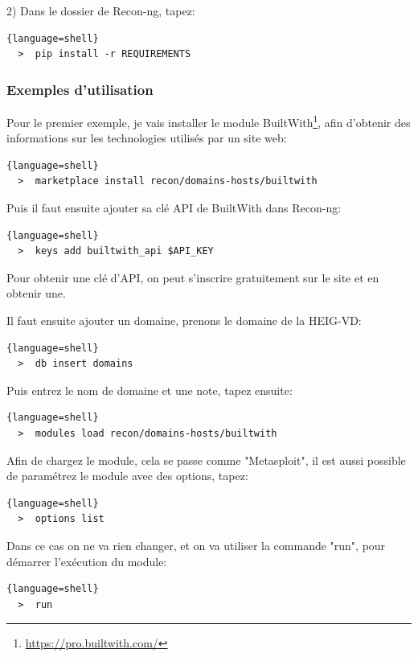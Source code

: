 2) Dans le dossier de Recon-ng, tapez:

\begin{lstlisting}{language=shell}
  >  pip install -r REQUIREMENTS
\end{lstlisting}

\subsubsection{Exemples d'utilisation}
Pour le premier exemple, je vais installer le module BuiltWith\footnote{\url{https://pro.builtwith.com/}}, afin d'obtenir des informations
sur les technologies utilisés par un site web:

\begin{lstlisting}{language=shell}
  >  marketplace install recon/domains-hosts/builtwith
\end{lstlisting}

Puis il faut ensuite ajouter sa clé API de BuiltWith dans Recon-ng:

\begin{lstlisting}{language=shell}
  >  keys add builtwith_api $API_KEY
\end{lstlisting}

Pour obtenir une clé d'API, on peut s'inscrire gratuitement sur le site et en obtenir une.

Il faut ensuite ajouter un domaine, prenons le domaine de la HEIG-VD:

\begin{lstlisting}{language=shell}
  >  db insert domains
\end{lstlisting}

Puis entrez le nom de domaine et une note, tapez ensuite:

\begin{lstlisting}{language=shell}
  >  modules load recon/domains-hosts/builtwith
\end{lstlisting}

Afin de chargez le module, cela se passe comme "Metasploit", il est aussi possible de paramétrez le
module avec des options, tapez:

\begin{lstlisting}{language=shell}
  >  options list
\end{lstlisting}

Dans ce cas on ne va rien changer, et on va utiliser la commande "run", pour démarrer l'exécution du module:

\begin{lstlisting}{language=shell}
  >  run
\end{lstlisting}

